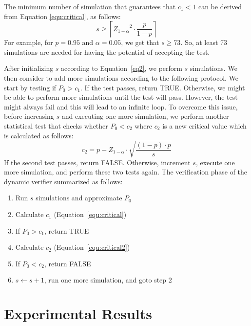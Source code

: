 \documentclass{article}
\begin{document}
The minimum number of simulation that guarantees that $c_1<1$ can be derived from Equation \ref{equ:critical}, as follows:
\begin{equation}\label{eq2}
    s \geq \left \lceil {Z_{1-\alpha}}^2 \cdot \frac{p}{1-p} \right \rceil
\end{equation}
For example, for $p=0.95$ and $\alpha=0.05$, we get that $s \geq 73$. So, at least 73 simulations are needed for having the potential of accepting the test. 




After initializing $s$ according to Equation~\ref{eq2}, we perform $s$ simulations. We then consider to add more simulations according to the following protocol. We start by testing if $P_0>c_1$. If the test passes, return TRUE. Otherwise, we might be able to perform more simulations until the test will pass. However, the test might always fail and this will lead to an infinite loop.  To overcome this issue, before increasing $s$ and executing one more simulation, we perform another statistical test that checks whether $P_0<c_2$ where $c_2$ is a new critical value which is calculated as follows:
\begin{equation}
c_2=p-Z_{1-\alpha} \cdot \sqrt{\frac{(1-p) \cdot p}{s}}
\label{equ:critical2}
\end{equation}
If the second test passes, return FALSE. Otherwise, increment $s$, execute one more simulation, and perform these two tests again. The verification phase of the dynamic verifier summarized as follows:
\begin{enumerate}
    \item Run $s$ simulations and approximate $P_0$
    \item Calculate $c_1$  (Equation~\ref{equ:critical})
    \item If $P_0>c_1$, return TRUE
    \item Calculate $c_2$ (Equation~\ref{equ:critical2})
    \item If $P_0<c_2$, return FALSE
    \item $s \gets s+1$, run one more simulation, and goto step 2
\end{enumerate}

\section{Experimental Results}
\label{sec:experiments1}
\end{document}
